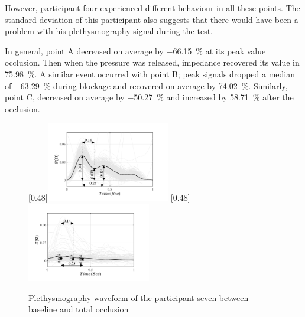 However, participant four experienced different behaviour in all these points. The standard deviation of this participant also suggests that there would have been a problem with his plethysmography signal during the test. 

In general, point A decreased on average by \SI{-66.15}{\percent} at its peak value occlusion. Then when the pressure was released, impedance recovered its value in \SI{75.98}{\percent}. A similar event occurred with point B; peak signals dropped a median of \SI{-63.29}{\percent} during blockage and recovered on average by \SI{74.02}{\percent}. Similarly, point C, decreased on average by \SI{-50.27}{\percent}  and increased by \SI{58.71}{\percent} after the occlusion.

\begin{figure}
	\centering
	\null\hfill%
	[0.48\textwidth]{\includegraphics[width=0.48\textwidth, trim={0.5cm 0cm 1.5cm 0 cm}, clip]{figure_apa_6a}}%
	\hfill%
	[0.48\textwidth]{\includegraphics[width=0.48\textwidth, trim={0.5cm 0cm 1.5cm 0 cm}, clip]{figure_apa_6b}}%
	\hfill\null%
	\caption{Plethysmography waveform of the participant seven between baseline and total occlusion}
	\label{fig:iPG_total}
	
	\vspace{1cm}
	

\end{figure}
